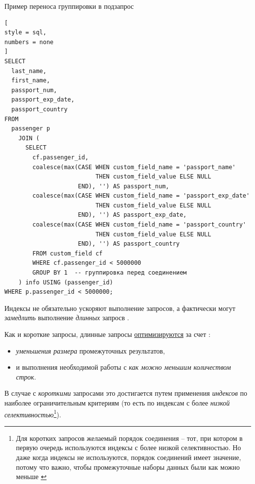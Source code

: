 \documentclass[%
	11pt,
	a4paper,
	utf8,
		]{article}
\begin{document}

Пример переноса группировки в подзапрос
\begin{lstlisting}[
style = sql,
numbers = none
]
SELECT
  last_name,
  first_name,
  passport_num,
  passport_exp_date,
  passport_country
FROM
  passenger p
    JOIN (
      SELECT
        cf.passenger_id,
        coalesce(max(CASE WHEN custom_field_name = 'passport_name'
                          THEN custom_field_value ELSE NULL
                     END), '') AS passport_num,
        coalesce(max(CASE WHEN custom_field_name = 'passport_exp_date'
                          THEN custom_field_value ELSE NULL
                     END), '') AS passport_exp_date,
        coalesce(max(CASE WHEN custom_field_name = 'passport_country'
                          THEN custom_field_value ELSE NULL
                     END), '') AS passport_country
        FROM custom_field cf
        WHERE cf.passenger_id < 5000000
        GROUP BY 1  -- группировка перед соединением
    ) info USING (passenger_id)
WHERE p.passenger_id < 5000000;
\end{lstlisting}

Индексы не обязательно ускоряют выполнение запросов, а фактически могут \emph{замедлить} выполнение \emph{длинных} запросв \cite[]{dombrovskaya:postgresql-2022}. 

Как и короткие запросы, длинные запросы \underline{оптимизируются} за счет \cite[]{dombrovskaya:postgresql-2022}:
\begin{itemize}
	\item \emph{уменьшения размера} промежуточных результатов,
	
	\item  и выполнения необходимой работы с \emph{как можно меньшим количеством строк}.
\end{itemize}


В случае с \emph{короткими} запросами это достигается путем применения \emph{индексов} по наиболее ограничительным критериям (то есть по индексам с более \emph{низкой селективностью}\footnote{Для коротких запросов желаемый порядок соединения -- тот, при котором в первую очередь используются индексы с более низкой селективностью. Но даже когда индексы не используются, порядок соединений имеет значение, потому что важно, чтобы промежуточные наборы данных были как можно меньше \cite[]{dombrovskaya:postgresql-2022}}).
\end{document}

